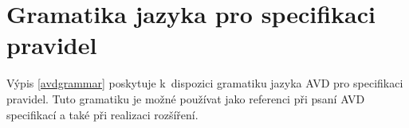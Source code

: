 \section{Gramatika jazyka pro specifikaci pravidel}
\label{avd_grammar}
Výpis \ref{avdgrammar} poskytuje k~dispozici gramatiku jazyka AVD pro specifikaci pravidel. Tuto gramatiku je možné používat jako referenci při psaní AVD specifikací a také při realizaci rozšíření.
\vspace{0.5cm}

